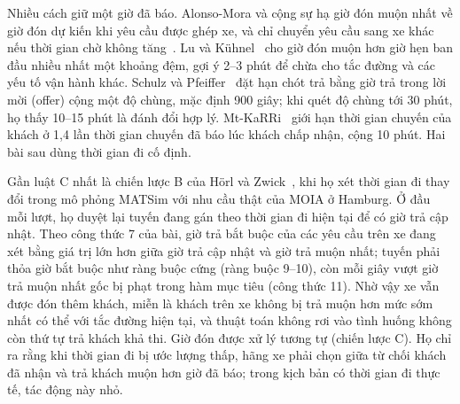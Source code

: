 Nhiều cách giữ một giờ đã báo. Alonso-Mora và cộng sự hạ giờ đón muộn nhất về giờ đón dự kiến khi yêu cầu được ghép
xe, và chỉ chuyển yêu cầu sang xe khác nếu thời gian chờ không tăng~\cite{alonsomora2017}. Lu và
Kühnel~\cite{lu2024} cho giờ đón muộn hơn giờ hẹn ban đầu nhiều nhất một khoảng đệm, gợi ý 2--3 phút để chừa cho tắc
đường và các yếu tố vận hành khác. Schulz và Pfeiffer~\cite{schulz2026} đặt hạn chót trả bằng giờ trả trong lời mời
(offer) cộng một độ chùng, mặc định 900 giây; khi quét độ chùng tới 30 phút, họ thấy 10--15 phút là đánh đổi hợp lý.
Mt-KaRRi~\cite{laupichler2026} giới hạn thời gian chuyến của khách ở 1,4 lần thời gian chuyến đã báo lúc khách chấp
nhận, cộng 10 phút. Hai bài sau dùng thời gian đi cố định.

Gần luật C nhất là chiến lược B của Hörl và Zwick~\cite{horl2022}, khi họ xét thời gian đi thay đổi trong mô phỏng
MATSim với nhu cầu thật của MOIA ở Hamburg. Ở đầu mỗi lượt, họ duyệt lại tuyến đang gán theo thời gian đi hiện tại để
có giờ trả cập nhật. Theo công thức 7 của bài, giờ trả bắt buộc của các yêu cầu trên xe đang xét bằng giá trị lớn hơn
giữa giờ trả cập nhật và giờ trả muộn nhất; tuyến phải thỏa giờ bắt buộc như ràng buộc cứng (ràng buộc 9--10), còn
mỗi giây vượt giờ trả muộn nhất gốc bị phạt trong hàm mục tiêu (công thức 11). Nhờ vậy xe vẫn được đón thêm khách, miễn
là khách trên xe không bị trả muộn hơn mức sớm nhất có thể với tắc đường hiện tại, và thuật toán không rơi vào tình
huống không còn thứ tự trả khách khả thi. Giờ đón được xử lý tương tự (chiến lược C). Họ chỉ ra rằng khi thời gian đi
bị ước lượng thấp, hãng xe phải chọn giữa từ chối khách đã nhận và trả khách muộn hơn giờ đã báo; trong kịch bản có
thời gian đi thực tế, tác động này nhỏ.

